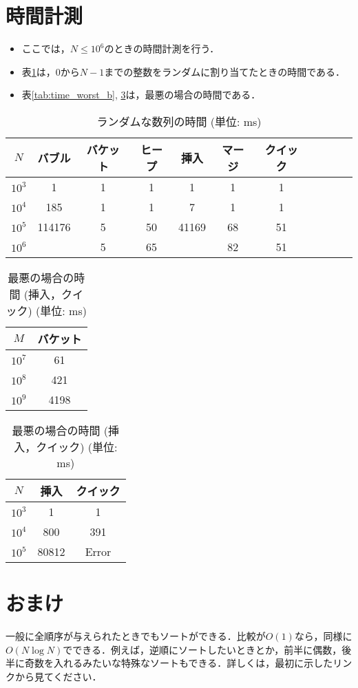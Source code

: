 \documentclass[slide,20pt]{ltjsarticle}
\begin{document}
\section{時間計測}

\begin{itemize}
  \item ここでは，$N \le 10 ^ 6$のときの時間計測を行う．
  \item 表\ref{tab:time_random}は，$0$から$N - 1$までの整数をランダムに割り当てたときの時間である．
  \item 表\ref{tab:time_worst_b}, \ref{tab:time_worst_q}は，最悪の場合の時間である．
\end{itemize}

\begin{table}[h]
  \centering
  \caption{ランダムな数列の時間 (単位: ms)}
  \label{tab:time_random}
  \begin{tabular}{|c|c|c|c|c|c|c|c|c|c|c|}
    \hline
    $N$ & バブル & バケット & ヒープ & 挿入 & マージ & クイック \\\hline
    $10 ^ 3$ & 1 & 1 & 1 & 1 & 1 & 1 \\\hline
    $10 ^ 4$ & 185 & 1 & 1 & 7 & 1 & 1 \\\hline
    $10 ^ 5$ & 114176 & 5 & 50 & 41169 & 68 & 51 \\\hline
    $10 ^ 6$ & \diagbox{}{}  & 5 & 65 & \diagbox{}{}  & 82 & 51 \\\hline
  \end{tabular}
\end{table}

\begin{table}[h]
  \centering
  \begin{minipage}{0.45\textwidth}
    \centering
    \caption{最悪の場合の時間 (バケット) (単位: ms)}
    \label{tab:time_worst_b}
    \begin{tabular}{|c|c|}
      \hline
      $M$ & バケット \\\hline
      $10 ^ 7$ & 61 \\\hline
      $10 ^ 8$ & 421 \\\hline
      $10 ^ 9$ & 4198 \\\hline
    \end{tabular}
  \end{minipage}
  \hfill
  \begin{minipage}{0.45\textwidth}
    \centering
    \caption{最悪の場合の時間 (挿入，クイック) (単位: ms)}
    \label{tab:time_worst_q}
    \begin{tabular}{|c|c|c|}
      \hline
      $N$ & 挿入 & クイック \\\hline
      $10 ^ 3$ & 1 & 1 \\\hline
      $10 ^ 4$ & 800 & 391 \\\hline
      $10 ^ 5$ & 80812 & Error \\\hline
    \end{tabular}
  \end{minipage}
\end{table}

\section{おまけ}

一般に全順序が与えられたときでもソートができる．比較が$O(1)$なら，同様に$O(N \log N)$でできる．例えば，逆順にソートしたいときとか，前半に偶数，後半に奇数を入れるみたいな特殊なソートもできる．詳しくは，最初に示したリンクから見てください．
\end{document}
